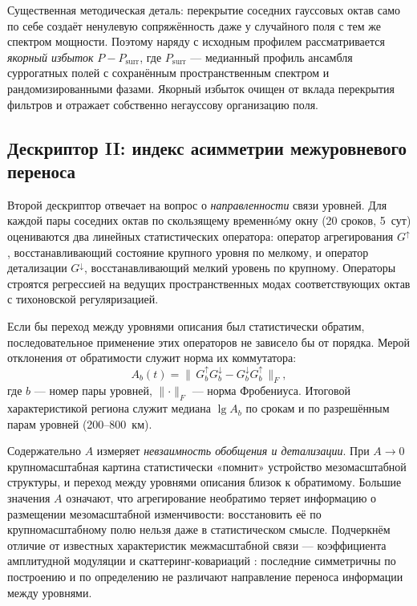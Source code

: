 \documentclass[11pt,a4paper]{article}
\begin{document}
Существенная методическая деталь: перекрытие соседних гауссовых октав само по себе создаёт ненулевую сопряжённость даже у случайного поля с тем же спектром мощности. Поэтому наряду с исходным профилем рассматривается \emph{якорный избыток} $P-P_{\mathrm{surr}}$, где $P_{\mathrm{surr}}$ --- медианный профиль ансамбля суррогатных полей с сохранённым пространственным спектром и рандомизированными фазами. Якорный избыток очищен от вклада перекрытия фильтров и отражает собственно негауссову организацию поля.

\subsection{Дескриптор II: индекс асимметрии межуровневого переноса}

Второй дескриптор отвечает на вопрос о \emph{направленности} связи уровней. Для каждой пары соседних октав по скользящему временнóму окну (20 сроков, 5~сут) оцениваются два линейных статистических оператора: оператор агрегирования $G^{\uparrow}$, восстанавливающий состояние крупного уровня по мелкому, и оператор детализации $G^{\downarrow}$, восстанавливающий мелкий уровень по крупному. Операторы строятся регрессией на ведущих пространственных модах соответствующих октав с тихоновской регуляризацией.

Если бы переход между уровнями описания был статистически обратим, последовательное применение этих операторов не зависело бы от порядка. Мерой отклонения от обратимости служит норма их коммутатора:
\begin{equation}
A_b(t)=\bigl\lVert\,G^{\uparrow}_b G^{\downarrow}_b-G^{\downarrow}_b G^{\uparrow}_b\,\bigr\rVert_F,
\label{eq:A}
\end{equation}
где $b$ --- номер пары уровней, $\lVert\cdot\rVert_F$ --- норма Фробениуса. Итоговой характеристикой региона служит медиана $\lg A_b$ по срокам и по разрешённым парам уровней (200--800~км).

Содержательно $A$ измеряет \emph{невзаимность обобщения и детализации}. При $A\to0$ крупномасштабная картина статистически «помнит» устройство мезомасштабной структуры, и переход между уровнями описания близок к обратимому. Большие значения $A$ означают, что агрегирование необратимо теряет информацию о размещении мезомасштабной изменчивости: восстановить её по крупномасштабному полю нельзя даже в статистическом смысле. Подчеркнём отличие от известных характеристик межмасштабной связи --- коэффициента амплитудной модуляции \cite{Mathis2009} и скаттеринг-ковариаций \cite{Cheng2024}: последние симметричны по построению и по определению не различают направление переноса информации между уровнями.
\end{document}
